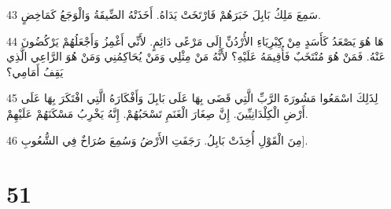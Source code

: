 \par 43 سَمِعَ مَلِكُ بَابِلَ خَبَرَهُمْ فَارْتَخَتْ يَدَاهُ. أَخَذَتْهُ الضِّيقَةُ وَالْوَجَعُ كَمَاخِضٍ.
\par 44 هَا هُوَ يَصْعَدُ كَأَسَدٍ مِنْ كِبْرِيَاءِ الأُرْدُنِّ إِلَى مَرْعًى دَائِمٍ. لأَنِّي أَغْمِزُ وَأَجْعَلُهُمْ يَرْكُضُونَ عَنْهُ. فَمَنْ هُوَ مُنْتَخَبٌ فَأُقِيمَهُ عَلَيْهِ؟ لأَنَّهُ مَنْ مِثْلِي وَمَنْ يُحَاكِمُنِي وَمَنْ هُوَ الرَّاعِي الَّذِي يَقِفُ أَمَامِي؟
\par 45 لِذَلِكَ اسْمَعُوا مَشُورَةَ الرَّبِّ الَّتِي قَضَى بِهَا عَلَى بَابِلَ وَأَفْكَارَهُ الَّتِي افْتَكَرَ بِهَا عَلَى أَرْضِ الْكِلْدَانِيِّينَ. إِنَّ صِغَارَ الْغَنَمِ تَسْحَبُهُمْ. إِنَّهُ يَخْرِبُ مَسْكَنَهُمْ عَلَيْهِمْ.
\par 46 مِنَ الْقَوْلِ أُخِذَتْ بَابِلُ. رَجَفَتِ الأَرْضُ وَسُمِعَ صُرَاخٌ فِي الشُّعُوبِ].

\chapter{51}

